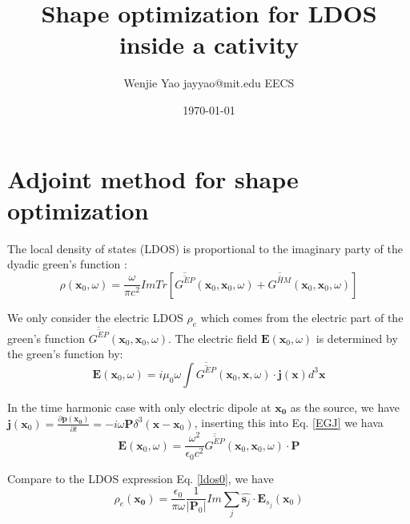 \documentclass[12pt]{article}
\begin{document}
\title{Shape optimization for LDOS inside a cativity}
\author{Wenjie Yao \quad jayyao@mit.edu \quad EECS}
\date{\today}
\maketitle


\section{Adjoint method for shape optimization}
The local density of states (LDOS) is proportional to the imaginary party of the dyadic green's function \cite{halfldos}:
\begin{equation}
\rho(\mathbf{x}_0,\omega)=\frac{\omega}{\pi c^2}ImTr[\overline{\overline{G^{EP}}}(\mathbf{x}_0,\mathbf{x}_0,\omega)+\overline{\overline{G^{HM}}}(\mathbf{x}_0,\mathbf{x}_0,\omega)]\label{ldos0}
\end{equation}

We only consider the electric LDOS $\rho_e$ which comes from the electric part of the green's function $\overline{\overline{G^{EP}}}(\mathbf{x}_0,\mathbf{x}_0,\omega)$. The electric field $\mathbf{E}(\mathbf{x}_0,\omega)$ is determined by the green's function by:
\begin{equation}
\mathbf{E}(\mathbf{x}_0,\omega)=i\mu_0\omega\int \overline{\overline{G^{EP}}}(\mathbf{x}_0,\mathbf{x},\omega)\cdot \mathbf{j}(\mathbf{x})d^3\mathbf{x}\label{EGJ}
\end{equation}

In the time harmonic case with only electric dipole at $\mathbf{x_0}$ as the source, we have $\mathbf{j}(\mathbf{x}_0) = \frac{\partial \mathbf{p(\mathbf{x}_0)}}{\partial t}=-i\omega \mathbf{P}\delta^3(\mathbf{x}-\mathbf{x}_0)$, inserting this into Eq. \eqref{EGJ} we hava
\begin{equation}
\mathbf{E}(\mathbf{x}_0,\omega)=\frac{\omega^2}{\epsilon_0c^2} \overline{\overline{G^{EP}}}(\mathbf{x}_0,\mathbf{x}_0,\omega)\cdot \mathbf{P}\label{EGP}
\end{equation}

Compare to the LDOS expression Eq. \eqref{ldos0}, we have 
\begin{equation}
\rho_e(\mathbf{x_0}) = \frac{\epsilon_0}{\pi\omega}\frac{1}{|\mathbf{P}_0|}Im\sum_j\hat{\mathbf{s}_j}\cdot \mathbf{E}_{s_j}(\mathbf{x}_0)\label{rhoe}
\end{equation}
\end{document}
